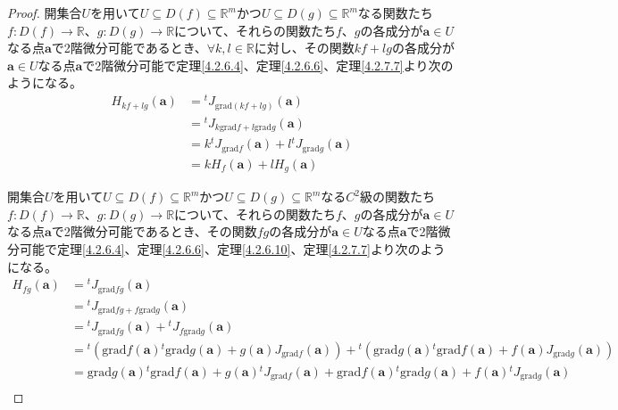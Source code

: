 \documentclass[dvipdfmx]{jsarticle}
\begin{document}
\begin{proof}
開集合$U$を用いて$U \subseteq D(f) \subseteq \mathbb{R}^{m}$かつ$U \subseteq D(g) \subseteq \mathbb{R}^{m}$なる関数たち$f:D(f) \rightarrow \mathbb{R}$、$g:D(g) \rightarrow \mathbb{R}$について、それらの関数たち$f$、$g$の各成分が$\mathbf{a} \in U$なる点$\mathbf{a}$で2階微分可能であるとき、$\forall k,l \in \mathbb{R}$に対し、その関数$kf + lg$の各成分が$\mathbf{a} \in U$なる点$\mathbf{a}$で2階微分可能で定理\ref{4.2.6.4}、定理\ref{4.2.6.6}、定理\ref{4.2.7.7}より次のようになる。
\begin{align*}
H_{kf + lg}\left( \mathbf{a} \right) &={}^{t}J_{\mathrm{grad}(kf + lg)}\left( \mathbf{a} \right)\\
&={}^{t}J_{k\mathrm{grad}f + l\mathrm{grad}g}\left( \mathbf{a} \right)\\
&= k{}^{t}J_{\mathrm{grad}f}\left( \mathbf{a} \right) + l{}^{t}J_{\mathrm{grad}g}\left( \mathbf{a} \right)\\
&= kH_{f}\left( \mathbf{a} \right) + lH_{g}\left( \mathbf{a} \right)
\end{align*}\par
開集合$U$を用いて$U \subseteq D(f) \subseteq \mathbb{R}^{m}$かつ$U \subseteq D(g) \subseteq \mathbb{R}^{m}$なる$C^{2}$級の関数たち$f:D(f) \rightarrow \mathbb{R}$、$g:D(g) \rightarrow \mathbb{R}$について、それらの関数たち$f$、$g$の各成分が$\mathbf{a} \in U$なる点$\mathbf{a}$で2階微分可能であるとき、その関数$fg$の各成分が$\mathbf{a} \in U$なる点$\mathbf{a}$で2階微分可能で定理\ref{4.2.6.4}、定理\ref{4.2.6.6}、定理\ref{4.2.6.10}、定理\ref{4.2.7.7}より次のようになる。
\begin{align*}
H_{fg}\left( \mathbf{a} \right) &={}^{t}J_{\mathrm{grad}{fg}}\left( \mathbf{a} \right)\\
&={}^{t}J_{\mathrm{grad}fg + f\mathrm{grad}g}\left( \mathbf{a} \right)\\
&={}^{t}J_{\mathrm{grad}fg}\left( \mathbf{a} \right) +{}^{t}J_{f\mathrm{grad}g}\left( \mathbf{a} \right)\\
&={}^{t}\left( \mathrm{grad}f\left( \mathbf{a} \right){}^{t}\mathrm{grad}g\left( \mathbf{a} \right) + g\left( \mathbf{a} \right)J_{\mathrm{grad}f}\left( \mathbf{a} \right) \right) +{}^{t}\left( \mathrm{grad}g\left( \mathbf{a} \right){}^{t}\mathrm{grad}f\left( \mathbf{a} \right) + f\left( \mathbf{a} \right)J_{\mathrm{grad}g}\left( \mathbf{a} \right) \right)\\
&= \mathrm{grad}g\left( \mathbf{a} \right){}^{t}\mathrm{grad}f\left( \mathbf{a} \right) + g\left( \mathbf{a} \right){}^{t}J_{\mathrm{grad}f}\left( \mathbf{a} \right) + \mathrm{grad}f\left( \mathbf{a} \right){}^{t}\mathrm{grad}g\left( \mathbf{a} \right) + f\left( \mathbf{a} \right){}^{t}J_{\mathrm{grad}g}\left( \mathbf{a} \right)\\

\end{align*}
\end{proof}
\end{document}
